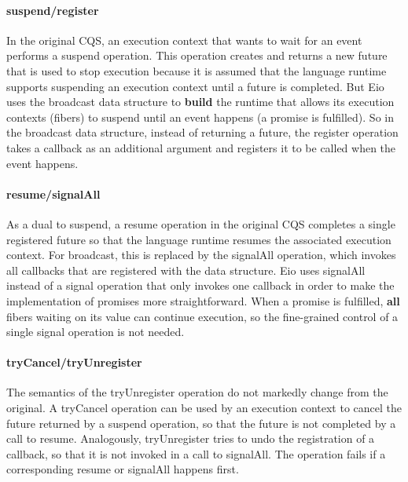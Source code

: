\paragraph*{suspend/register}
In the original CQS, an execution context that wants to wait for an event performs a suspend operation.
This operation creates and returns a new future that is used to stop execution because it is assumed that the language runtime supports suspending an execution context until a future is completed.
But Eio uses the broadcast data structure to \textbf{build} the runtime that allows its execution contexts (fibers) to suspend until an event happens (a promise is fulfilled).
So in the broadcast data structure, instead of returning a future, the register operation takes a callback as an additional argument and registers it to be called when the event happens.

\paragraph*{resume/signalAll}
As a dual to suspend, a resume operation in the original CQS completes a single registered future so that the language runtime resumes the associated execution context.
For broadcast, this is replaced by the signalAll operation, which invokes all callbacks that are registered with the data structure.
Eio uses signalAll instead of a signal operation that only invokes one callback in order to make the implementation of promises more straightforward.
When a promise is fulfilled, \textbf{all} fibers waiting on its value can continue execution, so the fine-grained control of a single signal operation is not needed.

\paragraph*{tryCancel/tryUnregister}
The semantics of the tryUnregister operation do not markedly change from the original.
A tryCancel operation can be used by an execution context to cancel the future returned by a suspend operation, so that the future is not completed by a call to resume.
Analogously, tryUnregister tries to undo the registration of a callback, so that it is not invoked in a call to signalAll.
The operation fails if a corresponding resume or signalAll happens first.

